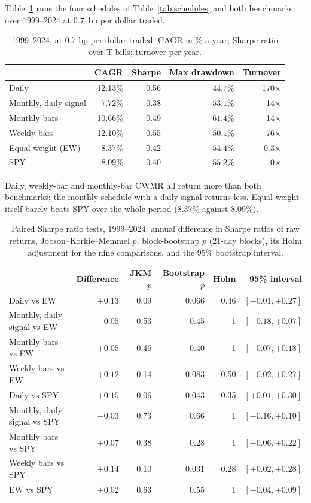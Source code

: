 \documentclass[11pt]{article}
\begin{document}
Table~\ref{tab:main} runs the four schedules of Table~\ref{tab:schedules} and both benchmarks
over 1999--2024 at 0.7~bp per dollar traded.

\begin{table}[ht]
\centering
\caption{1999--2024, at 0.7 bp per dollar traded. CAGR in \% a year; Sharpe ratio over T-bills;
turnover per year.}\label{tab:main}
\begin{tabular}{lrrrr}
\toprule
 & CAGR & Sharpe & Max drawdown & Turnover \\
\midrule
Daily & 12.13\% & 0.56 & $-44.7$\% & 170$\times$ \\
Monthly, daily signal & 7.72\% & 0.38 & $-53.1$\% & 14$\times$ \\
Monthly bars & 10.66\% & 0.49 & $-61.4$\% & 14$\times$ \\
Weekly bars & 12.10\% & 0.55 & $-50.1$\% & 76$\times$ \\
Equal weight (EW) & 8.37\% & 0.42 & $-54.4$\% & 0.3$\times$ \\
SPY & 8.09\% & 0.40 & $-55.2$\% & 0$\times$ \\
\bottomrule
\end{tabular}
\end{table}

Daily, weekly-bar and monthly-bar CWMR all return more than both benchmarks; the monthly
schedule with a daily signal returns less. Equal weight itself barely beats SPY over the whole
period (8.37\% against 8.09\%).

\begin{table}[ht]
\centering
\caption{Paired Sharpe ratio tests, 1999--2024: annual difference in Sharpe ratios of raw returns,
Jobson--Korkie--Memmel $p$, block-bootstrap $p$ (21-day blocks), its Holm adjustment for the
nine comparisons, and the 95\% bootstrap interval.}\label{tab:tests}
\begin{tabular}{lrrrrr}
\toprule
 & Difference & JKM $p$ & Bootstrap $p$ & Holm & 95\% interval \\
\midrule
Daily vs EW & $+0.13$ & 0.09 & 0.066 & 0.46 & $[-0.01, +0.27]$ \\
Monthly, daily signal vs EW & $-0.05$ & 0.53 & 0.45 & 1 & $[-0.18, +0.07]$ \\
Monthly bars vs EW & $+0.05$ & 0.46 & 0.40 & 1 & $[-0.07, +0.18]$ \\
Weekly bars vs EW & $+0.12$ & 0.14 & 0.083 & 0.50 & $[-0.02, +0.27]$ \\
Daily vs SPY & $+0.15$ & 0.06 & 0.043 & 0.35 & $[+0.01, +0.30]$ \\
Monthly, daily signal vs SPY & $-0.03$ & 0.73 & 0.66 & 1 & $[-0.16, +0.10]$ \\
Monthly bars vs SPY & $+0.07$ & 0.38 & 0.28 & 1 & $[-0.06, +0.22]$ \\
Weekly bars vs SPY & $+0.14$ & 0.10 & 0.031 & 0.28 & $[+0.02, +0.28]$ \\
EW vs SPY & $+0.02$ & 0.63 & 0.55 & 1 & $[-0.04, +0.09]$ \\
\bottomrule
\end{tabular}
\end{table}
\end{document}
